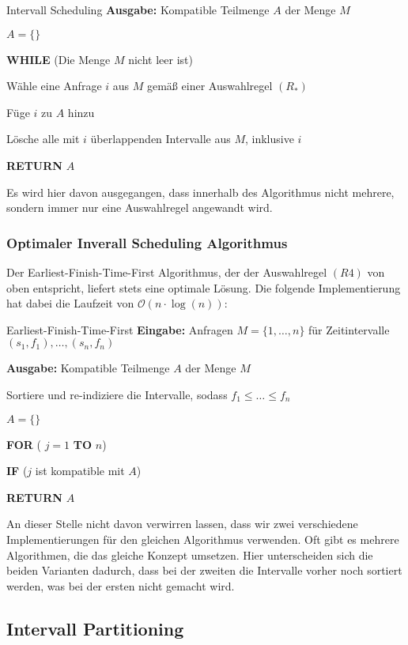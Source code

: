 \documentclass{panikzettel}
\newcommand\tab[1][1cm]{\hspace*{#1}}
\begin{document}
{\begin{algo}{Intervall Scheduling}
	\textbf{Ausgabe:} Kompatible Teilmenge $A$ der Menge $M$
	\tcblower
	
	$A = \{ \}$
	
	\textbf{WHILE} (Die Menge $M$ nicht leer ist)
	
	\tab Wähle eine Anfrage $i$ aus $M$ gemäß einer Auswahlregel $(R_*)$
	
	\tab Füge $i$ zu $A$ hinzu
	
	\tab Lösche alle mit $i$ überlappenden Intervalle aus $M$, inklusive $i$
	
	\textbf{RETURN} $A$
\end{algo}

Es wird hier davon ausgegangen, dass innerhalb des Algorithmus nicht mehrere, sondern immer nur eine Auswahlregel angewandt wird.

\subsubsection{Optimaler Inverall Scheduling Algorithmus}

Der Earliest-Finish-Time-First Algorithmus, der der Auswahlregel $(R4)$ von oben entspricht, liefert stets eine optimale Lösung. Die folgende Implementierung hat dabei die Laufzeit von $\mathcal{O}(n \cdot \log (n))$:

\begin{algo}{Earliest-Finish-Time-First}
	\textbf{Eingabe:} Anfragen $M= \{1, \dots , n\}$ für Zeitintervalle $(s_1,f_1), \dots,(s_n,f_n)$
	
	\textbf{Ausgabe:} Kompatible Teilmenge $A$ der Menge $M$
	\tcblower
	
	Sortiere und re-indiziere die Intervalle, sodass $f_1 \leq \dots \leq f_n$
	
	$A = \{ \}$
	
	\textbf{FOR} ( $j = 1$ \textbf{TO} $n$)
	
	\tab \textbf{IF} ($j$ ist kompatible mit $A$)
	
	\textbf{RETURN} $A$
\end{algo}

An dieser Stelle nicht davon verwirren lassen, dass wir zwei verschiedene Implementierungen für den gleichen Algorithmus verwenden. Oft gibt es mehrere Algorithmen, die das gleiche Konzept umsetzen. Hier unterscheiden sich die beiden Varianten dadurch, dass bei der zweiten die Intervalle vorher noch sortiert werden, was bei der ersten nicht gemacht wird. 

 
\subsection{Intervall Partitioning}

}
\end{document}
